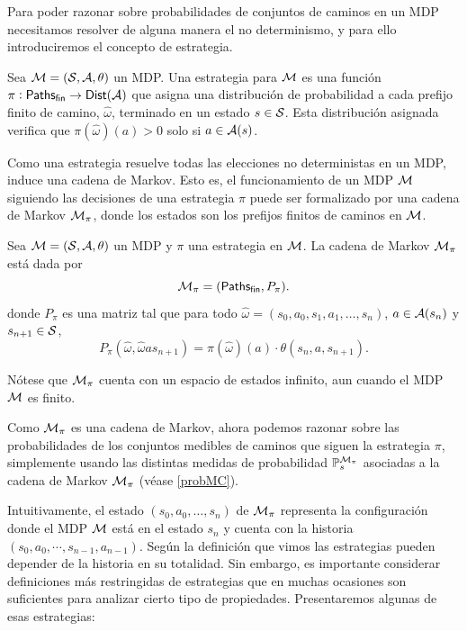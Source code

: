 Para poder razonar sobre probabilidades de conjuntos de caminos en un MDP
necesitamos resolver de alguna manera el no determinismo, y para ello
introduciremos el concepto de estrategia.

\begin{definition}
	Sea $\mathcal{M} = (\mathcal{S}, \mathcal{A}, \theta)$ un MDP. Una estrategia para $\mathcal{M}$ es una función $\pi: \textsf{Paths}_\textsf{fin} \rightarrow \mathsf{Dist} (\mathcal{A})$ que asigna una distribución de probabilidad a cada prefijo finito de camino, $\hat \omega$, terminado en un estado $s \in \mathcal{S}$. Esta distribución asignada verifica que $\pi(\hat \omega) (a) > 0$ solo si $a \in \mathcal{A}(s)$.
\end{definition}

Como una estrategia resuelve todas las elecciones no deterministas en un MDP,
induce una cadena de Markov. Esto es, el funcionamiento de un MDP $\mathcal{M}$
siguiendo las decisiones de una estrategia $\pi$ puede ser formalizado por una
cadena de Markov $\mathcal{M}_\pi$, donde los estados son los prefijos finitos de
caminos en $\mathcal{M}$.

\begin{definition}
	Sea $\mathcal{M} = (\mathcal{S}, \mathcal{A}, \theta)$ un MDP y $\pi$ una estrategia en $\mathcal{M}$. La cadena de Markov $\mathcal{M}_\pi$ está dada por
	$$\mathcal{M}_\pi = (\textsf{Paths}_\textsf{fin}, P_\pi).$$
	donde $P_\pi$ es una matriz tal que para todo $\hat \omega = (s_0, a_0, s_1, a_1, \dots, s_n)$, $ a \in \mathcal{A}(s_n)$ y $s_{n+1} \in \mathcal{S}$,
	$$P_\pi(\hat \omega, \hat \omega a s_{n+1}) = \pi(\hat \omega)(a) \cdot \theta(s_n, a, s_{n+1}).$$
\end{definition}

Nótese que $\mathcal{M}_\pi$ cuenta con un espacio de estados infinito, aun cuando el
MDP $\mathcal{M}$ es finito.

Como $\mathcal{M}_\pi$ es una cadena de Markov, ahora podemos razonar sobre las
probabilidades de los conjuntos medibles de caminos que siguen la estrategia
$\pi$, simplemente usando las distintas medidas de probabilidad
$\mathbb{P}^{\mathcal{M}_\pi}_s$ asociadas a la cadena de Markov $\mathcal{M}_\pi$ (véase
\ref{probMC}).


Intuitivamente, el estado $(s_0, a_0, \dots, s_n)$ de $\mathcal{M}_\pi$ representa la
configuración donde el MDP $\mathcal{M}$ está en el estado $s_n$ y cuenta con la
historia $(s_0, a_0, \cdots, s_{n-1}, a_{n-1})$. Según la definición que vimos
las estrategias pueden depender de la historia en su totalidad. Sin embargo, es
importante considerar definiciones más restringidas de estrategias que en
muchas ocasiones son suficientes para analizar cierto tipo de propiedades.
Presentaremos algunas de esas estrategias:

